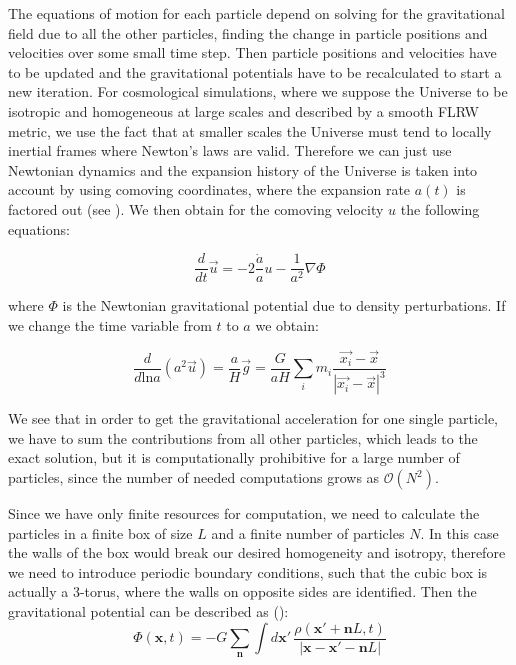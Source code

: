 The equations of motion for each particle depend on solving for the
gravitational field due to all the other particles, finding the change
in particle positions and velocities over some small time step. Then
particle positions and velocities have to be updated and the gravitational
potentials have to be recalculated to start a new iteration. For cosmological
simulations, where we suppose the Universe to be isotropic and homogeneous
at large scales and described by a smooth FLRW metric, we use the
fact that at smaller scales the Universe must tend to locally inertial
frames where Newton's laws are valid. Therefore we can just use Newtonian
dynamics and the expansion history of the Universe is taken into account
by using comoving coordinates, where the expansion rate $a(t)$ is
factored out (see \citet{peacock_cosmological_1999,dehnen_n-body_2011}).
We then obtain for the comoving velocity $u$ the following equations:

\begin{equation}
\frac{d}{dt}\vec{u}=-2\frac{\dot{a}}{a}u-\frac{1}{a^{2}}\nabla\Phi
\end{equation}


where $\Phi$ is the Newtonian gravitational potential due to density
perturbations. If we change the time variable from $t$ to $a$ we
obtain:

\begin{equation}
\frac{d}{d\mbox{ln}a}(a^{2}\vec{u})=\frac{a}{H}\vec{g}=\frac{G}{aH}\sum_{i}m_{i}\frac{\vec{x_{i}}-\vec{x}}{\left|\vec{x_{i}}-\vec{x}\right|^{3}}
\end{equation}


We see that in order to get the gravitational acceleration for one
single particle, we have to sum the contributions from all other particles,
which leads to the exact solution, but it is computationally prohibitive
for a large number of particles, since the number of needed computations
grows as $\mathcal{O}(N^{2})$. 

Since we have only finite resources for computation, we need to calculate
the particles in a finite box of size $L$ and a finite number of
particles $N$. In this case the walls of the box would break our
desired homogeneity and isotropy, therefore we need to introduce periodic
boundary conditions, such that the cubic box is actually a 3-torus,
where the walls on opposite sides are identified. Then the gravitational
potential can be described as (\citet{dehnen_n-body_2011}): 
\begin{equation}
\Phi(\mathbf{x},t)=-G\sum_{\mathbf{n}}\int d\mathbf{x}'\,\frac{\rho(\mathbf{x}'+\mathbf{n}L,t)}{\left|\mathbf{x-x}'-\mathbf{n}L\right|}
\end{equation}


